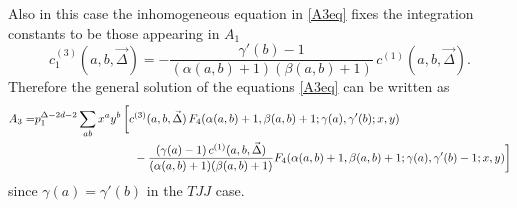 \documentclass[a4paper,11pt,openright,twoside]{book}
\let\a=\alpha   \let\b=\beta   \let\g=\gamma   \let\d=\delta
\numberwithin{equation}{section}
\begin{document}
{{{Also in this case the inhomogeneous equation in \eqref{A3eq} fixes the integration constants to be those appearing in $A_1$ 
\begin{equation}
	c_1^{(3)}(a,b,\vec \Delta)=-\frac{\gamma'(b)-1}{(\alpha(a,b)+1)(\beta(a,b)+1)}\, c^{(1)}(a,b,\vec\Delta).
\end{equation}
Therefore the general solution of the equations \eqref{A3eq} can be written as
\begin{align}
	A_3=&p_1^{\Delta-2 d -2} \sum_{a b} x^a y^b\,\bigg[c^{(3)}(a,b,\vec\Delta)\,F_4(\a(a,b)+1,\b(a,b)+1;\g(a),\g'(b);x,y)\notag\\
	&\hspace{3cm}-\frac{(\gamma(a)-1)\,c^{(1)}(a,b,\vec\Delta) }{(\alpha(a,b)+1)(\beta(a,b)+1)}F_4(\alpha(a,b)+1,\beta(a,b)+1; \gamma(a),\gamma'(b)-1;x,y)\bigg]
\end{align} 
since $\g(a)=\g'(b)$ in the $TJJ$ case. 

}}}
\end{document}
